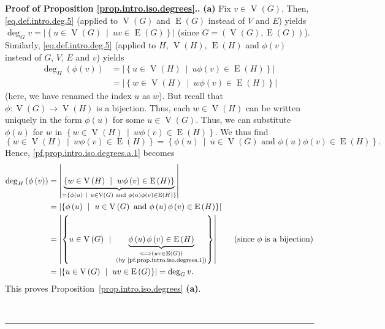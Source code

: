 \documentclass[numbers=enddot,12pt,final,onecolumn,notitlepage]{scrartcl}%
\theoremstyle{definition}
\newenvironment{proof}[1][Proof]{\noindent\textbf{#1.} }{\ \rule{0.5em}{0.5em}}
\newcommand{\set}[1]{\left\{ #1 \right\}}
\newcommand{\abs}[1]{\left| #1 \right|}
\newcommand{\tup}[1]{\left( #1 \right)}
\newcommand{\verts}[1]{\operatorname{V}\left( #1 \right)}
\newcommand{\edges}[1]{\operatorname{E}\left( #1 \right)}
\begin{document}
\begin{proof}[Proof of Proposition \ref{prop.intro.iso.degrees}.]
\textbf{(a)} Fix $v \in \verts{G}$. Then, \eqref{eq.def.intro.deg.5}
(applied to $\verts{G}$ and $\edges{G}$ instead of $V$ and $E$)
yields
$\deg_G v = \abs{\set{u \in \verts{G} \ \mid \ uv \in \edges{G}}}$
(since $G = \tup{\verts{G}, \edges{G}}$).
Similarly,
\eqref{eq.def.intro.deg.5} (applied to $H$, $\verts{H}$, $\edges{H}$
and $\phi\tup{v}$ instead of $G$, $V$, $E$ and $v$) yields
\begin{align}
\deg_H \tup{\phi\tup{v}}
&=
\abs{\set{u \in \verts{H} \ \mid \ u \phi\tup{v} \in \edges{H}}}
\nonumber \\
&=
\abs{\set{w \in \verts{H} \ \mid \ w \phi\tup{v} \in \edges{H}}}
\label{pf.prop.intro.iso.degrees.a.1}
\end{align}
(here, we have renamed the index $u$ as $w$).
But recall that $\phi : \verts{G} \to \verts{H}$ is a bijection. Thus,
each $w \in \verts{H}$ can be written uniquely in the form
$\phi\tup{u}$ for some $u \in \verts{G}$. Thus, we can substitute
$\phi\tup{u}$ for $w$ in
$\set{w \in \verts{H} \ \mid \ w \phi\tup{v} \in \edges{H}}$.
We thus find
\[
\set{w \in \verts{H} \ \mid \ w \phi\tup{v} \in \edges{H}}
= \set{\phi\tup{u} \ \mid \ u \in \verts{G} \text{ and }
\phi\tup{u}\phi\tup{v} \in \edges{H}} .
\]
Hence,
\eqref{pf.prop.intro.iso.degrees.a.1} becomes
\begin{align*}
\deg_H \tup{\phi\tup{v}}
&=
\abs{
\underbrace{\set{w \in \verts{H} \ \mid \ w \phi\tup{v}
             \in \edges{H}}}
            _{= \set{\phi\tup{u} \ \mid \ u \in \verts{G}
              \text{ and } \phi\tup{u} \phi\tup{v} \in \edges{H}}}}
\\
&=
\abs{\set{\phi\tup{u} \ \mid \ u \in \verts{G}
          \text{ and } \phi\tup{u} \phi\tup{v} \in \edges{H}}} \\
&=
\abs{\set{u \in \verts{G} \ \mid
          \ \underbrace{\phi\tup{u} \phi\tup{v} \in \edges{H}}
                 _{\substack{\Longleftrightarrow
                     \left( uv \in \edges{G} \right) \\
                     \text{(by \eqref{pf.prop.intro.iso.degrees.1})}}}
          }}
\qquad \left(\text{since } \phi \text{ is a bijection}\right) \\
&= \abs{\set{u \in \verts{G} \ \mid \ uv \in \edges{G}}}
= \deg_G v .
\end{align*}
This proves Proposition~\ref{prop.intro.iso.degrees} \textbf{(a)}.


\end{proof}
\end{document}
